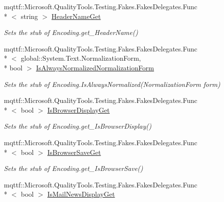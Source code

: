 \begin{DoxyCompactItemize}
mqttf\-::\-Microsoft.\-Quality\-Tools.\-Testing.\-Fakes.\-Fakes\-Delegates.\-Func\\*
$<$ string $>$ \hyperlink{class_system_1_1_text_1_1_fakes_1_1_stub_unicode_encoding_a9dd9396a21fd297a9ad3e0239ad62adc}{Header\-Name\-Get}
\begin{DoxyCompactList}\small\item\em Sets the stub of Encoding.\-get\-\_\-\-Header\-Name()\end{DoxyCompactList}\item 
mqttf\-::\-Microsoft.\-Quality\-Tools.\-Testing.\-Fakes.\-Fakes\-Delegates.\-Func\\*
$<$ global\-::\-System.\-Text.\-Normalization\-Form, \\*
bool $>$ \hyperlink{class_system_1_1_text_1_1_fakes_1_1_stub_unicode_encoding_a96f99ab89f57cb78afaa1f51977bfdb8}{Is\-Always\-Normalized\-Normalization\-Form}
\begin{DoxyCompactList}\small\item\em Sets the stub of Encoding.\-Is\-Always\-Normalized(\-Normalization\-Form form)\end{DoxyCompactList}\item 
mqttf\-::\-Microsoft.\-Quality\-Tools.\-Testing.\-Fakes.\-Fakes\-Delegates.\-Func\\*
$<$ bool $>$ \hyperlink{class_system_1_1_text_1_1_fakes_1_1_stub_unicode_encoding_a235050e6173c5302b415048da05db192}{Is\-Browser\-Display\-Get}
\begin{DoxyCompactList}\small\item\em Sets the stub of Encoding.\-get\-\_\-\-Is\-Browser\-Display()\end{DoxyCompactList}\item 
mqttf\-::\-Microsoft.\-Quality\-Tools.\-Testing.\-Fakes.\-Fakes\-Delegates.\-Func\\*
$<$ bool $>$ \hyperlink{class_system_1_1_text_1_1_fakes_1_1_stub_unicode_encoding_abbcd411d211c5b6b31d22351a5507a82}{Is\-Browser\-Save\-Get}
\begin{DoxyCompactList}\small\item\em Sets the stub of Encoding.\-get\-\_\-\-Is\-Browser\-Save()\end{DoxyCompactList}\item 
mqttf\-::\-Microsoft.\-Quality\-Tools.\-Testing.\-Fakes.\-Fakes\-Delegates.\-Func\\*
$<$ bool $>$ \hyperlink{class_system_1_1_text_1_1_fakes_1_1_stub_unicode_encoding_abd7f735ecb5cd3158cb8c6b091a03f89}{Is\-Mail\-News\-Display\-Get}

\end{DoxyCompactItemize}
